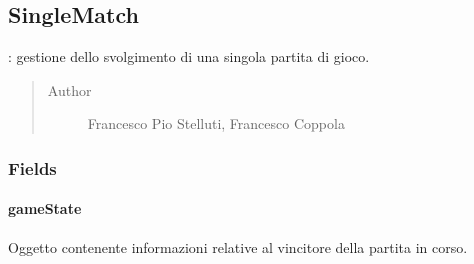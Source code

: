 \documentclass[letterpaper,10pt,italian,openany,oneside]{sphinxmanual}
\begin{document}
\subsection{SingleMatch}
\label{\detokenize{test/it/unicam/cs/pa/mastermind/gamecore/SingleMatch:singlematch}}\label{\detokenize{test/it/unicam/cs/pa/mastermind/gamecore/SingleMatch::doc}}

\begin{fulllineitems}
\label{\detokenize{test/it/unicam/cs/pa/mastermind/gamecore/SingleMatch:it.unicam.cs.pa.mastermind.gamecore.SingleMatch}}
: gestione dello svolgimento di una singola partita di gioco.
\begin{quote}\begin{description}
\item[{Author}] \leavevmode
Francesco Pio Stelluti, Francesco Coppola

\end{description}\end{quote}

\end{fulllineitems}



\subsubsection{Fields}
\label{\detokenize{test/it/unicam/cs/pa/mastermind/gamecore/SingleMatch:fields}}

\paragraph{gameState}
\label{\detokenize{test/it/unicam/cs/pa/mastermind/gamecore/SingleMatch:gamestate}}

\begin{fulllineitems}
\label{\detokenize{test/it/unicam/cs/pa/mastermind/gamecore/SingleMatch:it.unicam.cs.pa.mastermind.gamecore.SingleMatch.gameState}}
Oggetto contenente informazioni relative al vincitore della partita in corso.

\end{fulllineitems}
\end{document}
